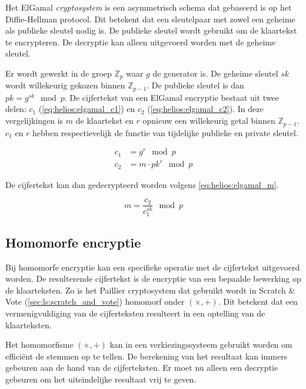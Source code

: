 Het ElGamal \textit{cryptosystem} is een asymmetrisch schema dat gebaseerd is op het Diffie-Hellman protocol. Dit betekent dat een sleutelpaar met zowel een geheime als publieke sleutel nodig is. De publieke sleutel wordt gebruikt om de klaartekst te encrypteren. De decryptie kan alleen uitgevoerd worden met de geheime sleutel.

\npar Er wordt gewerkt in de groep $\mathbb{Z}_p$ waar $g$ de generator is. De geheime sleutel $sk$ wordt willekeurig gekozen binnen $\mathbb{Z}_{p-1}$. De publieke sleutel is dan ${pk} = g^{sk} \mod{p}$. De cijfertekst van een ElGamal encryptie bestaat uit twee delen: $c_1$ (\ref{eq:helios:elgamal_c1}) en $c_2$ (\ref{eq:helios:elgamal_c2}). In deze vergelijkingen is $m$ de klaartekst en $r$ opnieuw een willekeurig getal binnen $\mathbb{Z}_{p-1}$. $c_1$ en $r$ hebben respectievelijk de functie van tijdelijke publieke en private sleutel.\cite{preneel_cryptography_and_network_security}

\begin{align}
  \label{eq:helios:elgamal_c1} 
  c_1 & = g^r \mod{p} \\
  \label{eq:helios:elgamal_c2}
  c_2 & = m \cdot {pk}^r \mod{p}
\end{align}

\npar De cijfertekst kan dan gedecrypteerd worden volgens \ref{eq:helios:elgamal_m}.

\begin{equation}
  \label{eq:helios:elgamal_m}
  m = \frac{c_2}{c_1^{sk}} \mod{p}
\end{equation}

\subsection{Homomorfe encryptie}
\label{sec:helios:homomorfe_encryptie}

Bij homomorfe encryptie kan een specifieke operatie met de cijfertekst uitgevoerd worden. De resulterende cijfertekst is de encryptie van een bepaalde bewerking op de klaarteksten.\cite{wiki:homomorphic_encryption} Zo is het Paillier cryptosystem dat gebruikt wordt in Scratch \& Vote (\ref{sec:ls:scratch_and_vote}) homomorf onder $(\times, +)$. Dit betekent dat een vermenigvuldiging van de cijferteksten resulteert in een optelling van de klaarteksten.

\npar Het homomorfisme $(\times, +)$ kan in een verkiezingssysteem gebruikt worden om effici\"ent de stemmen op te tellen. De berekening van het resultaat kan immers gebeuren aan de hand van de cijferteksten. Er moet nu alleen een decryptie gebeuren om het uiteindelijke resultaat vrij te geven.

